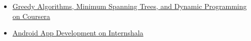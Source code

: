 \begin{justify}

\begin{itemize}
    \item \href{https://www.coursera.org/account/accomplishments/certificate/EAHYMWXEXJ7U}{Greedy Algorithms, Minimum Spanning Trees, and Dynamic Programming on Coursera}
    \item \href{https://www.dropbox.com/s/6l245ql0brkzeyx/Android%20App%20Development%20Training%20-%20Certificate%20of%20Completion.pdf?dl=0}{Android App Development on Internshala}
\end{itemize}

\end{justify}